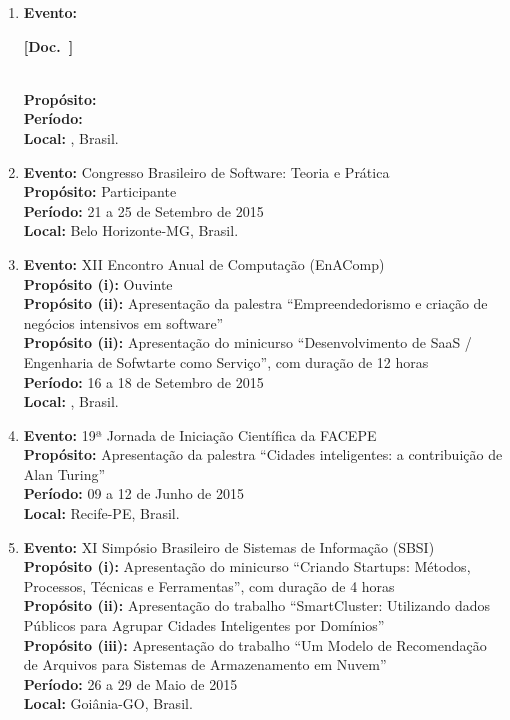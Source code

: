 \documentclass[a4paper,oneside,10pt]{article}
\newcounter{document}%
\newcommand\Doc{{\addtocounter{document}{1}\mbox{\sffamily\bfseries [Doc. \arabic{document}]}}}
\begin{document}
\begin{enumerate}
\renewcommand{\labelenumi}{{\large\bfseries\arabic{enumi}.}}

\item   \textbf{Evento:} \Doc \\
        \textbf{Propósito:} \\
        \textbf{Período:} \\
        \textbf{Local:} , Brasil.

\item   \textbf{Evento:} Congresso Brasileiro de Software: Teoria e Prática \mbox{} \\
        \textbf{Propósito:} Participante\\
        \textbf{Período:} 21 a 25 de Setembro de 2015\\
        \textbf{Local:} Belo Horizonte-MG, Brasil.

\item   \textbf{Evento:} XII Encontro Anual de Computação (EnAComp) \mbox{} \\
        \textbf{Propósito (i):} Ouvinte\\
        \textbf{Propósito (ii):} Apresentação da palestra ``Empreendedorismo e criação de negócios intensivos em software''\\
        \textbf{Propósito (ii):} Apresentação do minicurso ``Desenvolvimento de SaaS / Engenharia de Sofwtarte como Serviço'', com duração de 12 horas\\
        \textbf{Período:} 16 a 18 de Setembro de 2015\\
        \textbf{Local:} , Brasil.

\item   \textbf{Evento:} 19ª Jornada de Iniciação Científica da FACEPE \mbox{} \\
        \textbf{Propósito:} Apresentação da palestra ``Cidades inteligentes: a contribuição de Alan Turing''\\
        \textbf{Período:} 09 a 12 de Junho de 2015\\
        \textbf{Local:} Recife-PE, Brasil.

\item   \textbf{Evento:} XI Simpósio Brasileiro de Sistemas de Informação (SBSI) \mbox{} \\
        \textbf{Propósito (i):} Apresentação do minicurso ``Criando Startups: Métodos, Processos, Técnicas e Ferramentas'', com duração de 4 horas\\
        \textbf{Propósito (ii):} Apresentação do trabalho ``SmartCluster: Utilizando dados Públicos para Agrupar Cidades Inteligentes por Domínios''\\
        \textbf{Propósito (iii):} Apresentação do trabalho ``Um Modelo de Recomendação de Arquivos para Sistemas de Armazenamento em Nuvem''\\
        \textbf{Período:} 26 a 29 de Maio de 2015\\
        \textbf{Local:} Goiânia-GO, Brasil.


\end{enumerate}
\end{document}
